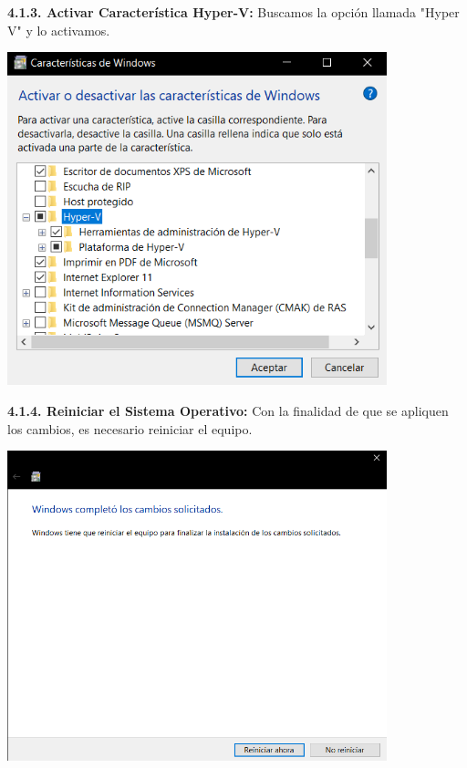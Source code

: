 \textbf {4.1.3. Activar Característica Hyper-V:} Buscamos la opción llamada "Hyper V" y lo activamos.\\
\begin{center}
  \includegraphics[width=11cm]{Imagenes/Activar_Hyper_V.png}
\end{center}

\textbf {4.1.4. Reiniciar el Sistema Operativo:} Con la finalidad de que se apliquen los cambios, es necesario reiniciar el equipo.
\begin{center}
  \includegraphics[width=11cm]{Imagenes/Reiniciar.png}
\end{center}
\break

